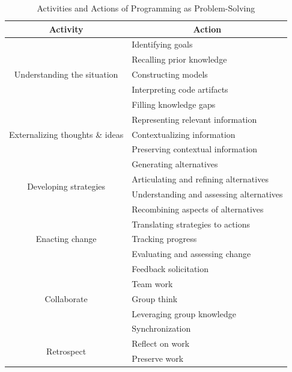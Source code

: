 \documentclass{ppig}
\begin{document}
\begin{table}[!htbp]
\caption{Activities and Actions of Programming as Problem-Solving}
\label{matrix}
\centering
\begin{tabular}{|c|l|}
	\hline
	\multicolumn{1}{|c|}{\textbf{Activity}} 
	& \multicolumn{1}{c|}{\textbf{Action}}\\\hline
	\multirow{5}{*}{Understanding the situation} 
	& Identifying goals \\\cline{2-2}
	& Recalling prior knowledge \\\cline{2-2}
	& Constructing models \\\cline{2-2}
	& Interpreting code artifacts \\\cline{2-2}
	& Filling knowledge gaps \\\hline
	\multirow{3}{*}{Externalizing thoughts \& ideas} 
	& Representing relevant information \\\cline{2-2}
	& Contextualizing information \\\cline{2-2}
	& Preserving contextual information \\\hline
	\multirow{4}{*}{Developing strategies} 
	& Generating alternatives \\\cline{2-2}
	& Articulating and refining alternatives \\\cline{2-2}
	& Understanding and assessing alternatives \\\cline{2-2}
	& Recombining aspects of alternatives \\\hline
	\multirow{3}{*}{Enacting change} 
	& Translating strategies to actions \\\cline{2-2}
	& Tracking progress \\\cline{2-2}
	& Evaluating and assessing change \\\hline
	\multirow{5}{*}{Collaborate} 
	& Feedback solicitation \\\cline{2-2}
	& Team work \\\cline{2-2}
	& Group think \\\cline{2-2}
	& Leveraging group knowledge \\\cline{2-2}
	& Synchronization \\\hline
	\multirow{2}{*}{Retrospect} 
	& Reflect on work \\\cline{2-2}
	& Preserve work \\\hline
\end{tabular}
\end{table}
\end{document}

